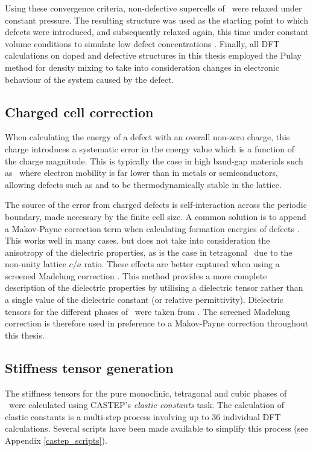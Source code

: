 Using these convergence criteria, non-defective supercells of \zirconia\ were relaxed under constant pressure. The resulting structure was used as the starting point to which defects were introduced, and subsequently relaxed again, this time under constant volume conditions to simulate low defect concentrations \cite{Murphy2014, Bell2015}. Finally, all DFT calculations on doped and defective structures in this thesis employed the Pulay method for density mixing \cite{Pulay1980} to take into consideration changes in electronic behaviour of the system caused by the defect.

\subsection{Charged cell correction}

When calculating the energy of a defect with an overall non-zero charge, this charge introduces a systematic error in the energy value which is a function of the charge magnitude. This is typically the case in high band-gap materials such as \zirconia\ where electron mobility is far lower than in metals or semiconductors, allowing defects such as  and  to be thermodynamically stable in the lattice. 

The source of the error from charged defects is self-interaction across the periodic boundary, made necessary by the finite cell size. A common solution is to append a Makov-Payne correction term when calculating formation energies of defects \cite{Makov1995, Makov1996}. This works well in many cases, but does not take into consideration the anisotropy of the dielectric properties, as is the case in tetragonal \zirconia\ due to the non-unity lattice $c/a$ ratio. These effects are better captured when using a screened Madelung correction \cite{Murphy2013}. This method provides a more complete description of the dielectric properties by utilising a dielectric tensor rather than a single value of the dielectric constant (or relative permittivity). Dielectric tensors for the different phases of \zirconia\ were taken from \cite{Zhao2002a, Zhao2002}. The screened Madelung correction is therefore used in preference to a Makov-Payne correction throughout this thesis.

\subsection{Stiffness tensor generation}

The stiffness tensors for the pure monoclinic, tetragonal and cubic phases of \zirconia\ were calculated using CASTEP's \emph{elastic constants} task. The calculation of elastic constants is a multi-step process involving up to 36 individual DFT calculations. Several scripts have been made available to simplify this process (see Appendix \ref{castep_scripts}).

